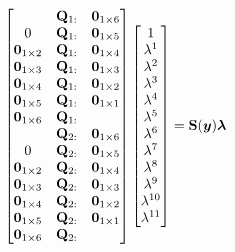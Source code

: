 \documentclass[oneside, 11pt]{book}
\begin{document}
\begin{equation}
    \begin{bmatrix}
        & \mathbf{Q}_{1:} & \bm{0}_{1\times 6} \\
        0 & \mathbf{Q}_{1:} & \bm{0}_{1\times 5} \\
        \bm{0}_{1\times 2} & \mathbf{Q}_{1:} & \bm{0}_{1\times 4} \\
        \bm{0}_{1\times 3} & \mathbf{Q}_{1:} & \bm{0}_{1\times 3} \\
        \bm{0}_{1\times 4} & \mathbf{Q}_{1:} & \bm{0}_{1\times 2} \\
        \bm{0}_{1\times 5} & \mathbf{Q}_{1:} & \bm{0}_{1\times 1} \\
        \bm{0}_{1\times 6} & \mathbf{Q}_{1:} & \\
        & \mathbf{Q}_{2:} & \bm{0}_{1\times 6} \\
        0 & \mathbf{Q}_{2:} & \bm{0}_{1\times 5} \\
        \bm{0}_{1\times 2} & \mathbf{Q}_{2:} & \bm{0}_{1\times 4} \\
        \bm{0}_{1\times 3} & \mathbf{Q}_{2:} & \bm{0}_{1\times 3} \\
        \bm{0}_{1\times 4} & \mathbf{Q}_{2:} & \bm{0}_{1\times 2} \\
        \bm{0}_{1\times 5} & \mathbf{Q}_{2:} & \bm{0}_{1\times 1} \\
        \bm{0}_{1\times 6} & \mathbf{Q}_{2:} & \\
    \end{bmatrix}
    \begin{bmatrix}
        1 \\
        \lambda^1 \\
        \lambda^2 \\
        \lambda^3 \\
        \lambda^4 \\
        \lambda^5 \\
        \lambda^6 \\
        \lambda^7 \\
        \lambda^8 \\
        \lambda^9 \\
        \lambda^{10} \\
        \lambda^{11}
    \end{bmatrix}
    =
    \mathbf{S}(\bm{y})\bm{\lambda}
    \label{eqn:inhomog_poly}
\end{equation}
\end{document}
